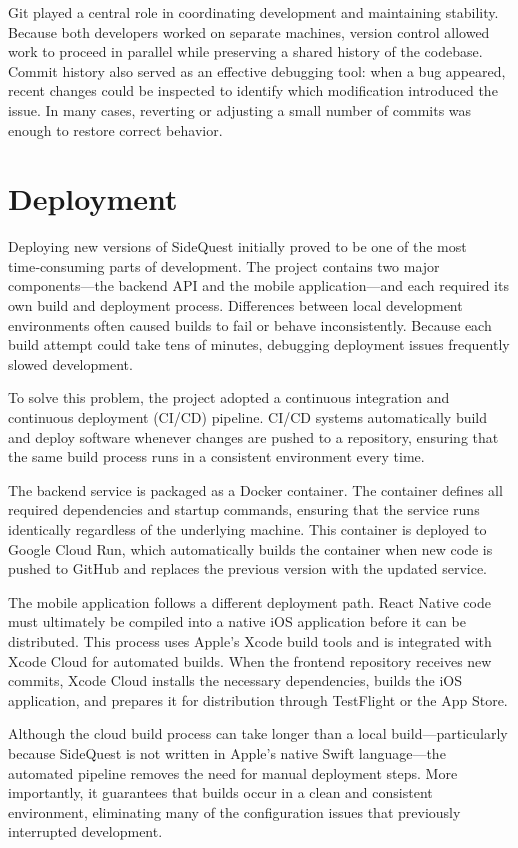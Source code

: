 \documentclass[12pt,a4paper,oneside]{report}
\begin{document}
Git played a central role in coordinating development and maintaining stability. Because both developers worked on separate machines, version control allowed work to proceed in parallel while preserving a shared history of the codebase. Commit history also served as an effective debugging tool: when a bug appeared, recent changes could be inspected to identify which modification introduced the issue. In many cases, reverting or adjusting a small number of commits was enough to restore correct behavior.

\section{Deployment}

Deploying new versions of SideQuest initially proved to be one of the most time‑consuming parts of development. The project contains two major components—the backend API and the mobile application—and each required its own build and deployment process. Differences between local development environments often caused builds to fail or behave inconsistently. Because each build attempt could take tens of minutes, debugging deployment issues frequently slowed development.

To solve this problem, the project adopted a continuous integration and continuous deployment (CI/CD) pipeline. CI/CD systems automatically build and deploy software whenever changes are pushed to a repository, ensuring that the same build process runs in a consistent environment every time.

The backend service is packaged as a Docker container. The container defines all required dependencies and startup commands, ensuring that the service runs identically regardless of the underlying machine. This container is deployed to Google Cloud Run, which automatically builds the container when new code is pushed to GitHub and replaces the previous version with the updated service.

The mobile application follows a different deployment path. React Native code must ultimately be compiled into a native iOS application before it can be distributed. This process uses Apple’s Xcode build tools and is integrated with Xcode Cloud for automated builds. When the frontend repository receives new commits, Xcode Cloud installs the necessary dependencies, builds the iOS application, and prepares it for distribution through TestFlight or the App Store.

Although the cloud build process can take longer than a local build—particularly because SideQuest is not written in Apple’s native Swift language—the automated pipeline removes the need for manual deployment steps. More importantly, it guarantees that builds occur in a clean and consistent environment, eliminating many of the configuration issues that previously interrupted development.
\end{document}
